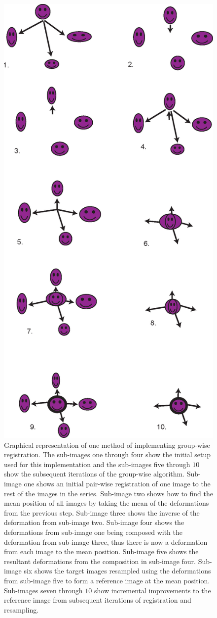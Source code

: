             \begin{figure}
                \centering
                        
                \includegraphics[width=0.4\linewidth]{figures/background_applying_image_registration_groupwise_breakdown.png}
                        
                \captionsetup{singlelinecheck=false, justification=raggedright}
                \caption{Graphical representation of one method of implementing group-wise registration. The sub-images one through four show the initial setup used for this implementation and the sub-images five through $10$ show the subsequent iterations of the group-wise algorithm. Sub-image one shows an initial pair-wise registration of one image to the rest of the images in the series. Sub-image two shows how to find the mean position of all images by taking the mean of the deformations from the previous step. Sub-image three shows the inverse of the deformation from sub-image two. Sub-image four shows the deformations from sub-image one being composed with the deformation from sub-image three, thus there is now a deformation from each image to the mean position. Sub-image five shows the resultant deformations from the composition in sub-image four. Sub-image six shows the target images resampled using the deformations from sub-image five to form a reference image at the mean position. Sub-images seven through $10$ show incremental improvements to the reference image from subsequent iterations of registration and resampling.} \label{fig:applying_image_registration_group-wise_breakdown}
            \end{figure}
            
